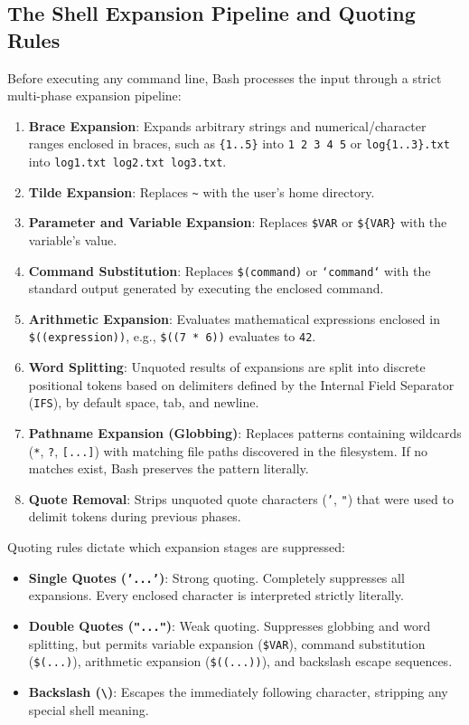 \documentclass[12pt,a4paper]{article}
\begin{document}
\subsection{The Shell Expansion Pipeline and Quoting Rules}
Before executing any command line, Bash processes the input through a strict multi-phase expansion pipeline:
\begin{enumerate}
    \item \textbf{Brace Expansion}: Expands arbitrary strings and numerical/character ranges enclosed in braces, such as \texttt{\{1..5\}} into \texttt{1 2 3 4 5} or \texttt{log\{1..3\}.txt} into \texttt{log1.txt log2.txt log3.txt}.
    \item \textbf{Tilde Expansion}: Replaces \texttt{\~} with the user's home directory.
    \item \textbf{Parameter and Variable Expansion}: Replaces \texttt{\$VAR} or \texttt{\$\{VAR\}} with the variable's value.
    \item \textbf{Command Substitution}: Replaces \texttt{\$(command)} or \texttt{`command`} with the standard output generated by executing the enclosed command.
    \item \textbf{Arithmetic Expansion}: Evaluates mathematical expressions enclosed in \texttt{\$((expression))}, e.g., \texttt{\$((7 * 6))} evaluates to \texttt{42}.
    \item \textbf{Word Splitting}: Unquoted results of expansions are split into discrete positional tokens based on delimiters defined by the Internal Field Separator (\texttt{IFS}), by default space, tab, and newline.
    \item \textbf{Pathname Expansion (Globbing)}: Replaces patterns containing wildcards (\texttt{*}, \texttt{?}, \texttt{[...]}) with matching file paths discovered in the filesystem. If no matches exist, Bash preserves the pattern literally.
    \item \textbf{Quote Removal}: Strips unquoted quote characters (\texttt{'}, \texttt{"}) that were used to delimit tokens during previous phases.
\end{enumerate}

Quoting rules dictate which expansion stages are suppressed:
\begin{itemize}
    \item \textbf{Single Quotes (\texttt{'...'})}: Strong quoting. Completely suppresses all expansions. Every enclosed character is interpreted strictly literally.
    \item \textbf{Double Quotes (\texttt{"..."})}: Weak quoting. Suppresses globbing and word splitting, but permits variable expansion (\texttt{\$VAR}), command substitution (\texttt{\$(...)}), arithmetic expansion (\texttt{\$((...))}), and backslash escape sequences.
    \item \textbf{Backslash (\texttt{\textbackslash})}: Escapes the immediately following character, stripping any special shell meaning.
\end{itemize}
\end{document}
